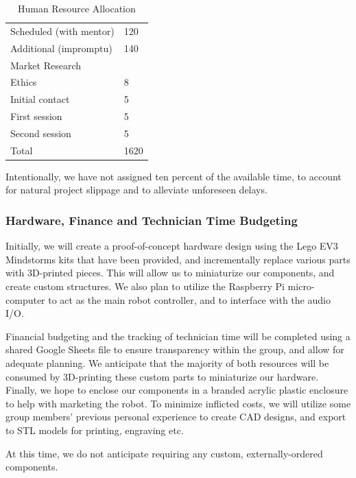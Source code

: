 \documentclass{article}
\begin{document}
\begin{table}[]
\begin{center}
\begin{small}
\begin{tabular}{|l|l|}
\quad Scheduled (with mentor)        & 120   \\
\quad Additional (impromptu)         & 140   \\ \hline
Market Research                &       \\
\quad Ethics                         & 8     \\
\quad Initial contact                & 5     \\
\quad First session                  & 5     \\
\quad Second session                 & 5     \\ \hline
Total                          & 1620  \\ \hline
\end{tabular}
\end{small}
\caption{Human Resource Allocation}
\label{table:hours}
\end{center}
\end{table}

Intentionally, we have not assigned ten percent of the available time, to account for natural project slippage and to alleviate unforeseen delays.

\subsubsection{Hardware, Finance and Technician Time Budgeting}

Initially, we will create a proof-of-concept hardware design using the Lego EV3 Mindstorms kits that have been provided, and incrementally replace various parts with 3D-printed pieces. This will allow us to miniaturize our components, and create custom structures. We also plan to utilize the Raspberry Pi micro-computer to act as the main robot controller, and to interface with the audio I/O.

Financial budgeting and the tracking of technician time will be completed using a shared Google Sheets file to ensure transparency within the group, and allow for adequate planning. We anticipate that the majority of both resources will be consumed by 3D-printing these custom parts to miniaturize our hardware. Finally, we hope to enclose our components in a branded acrylic plastic enclosure to help with marketing the robot. To minimize inflicted costs, we will utilize some group members' previous personal experience to create CAD designs, and export to STL models for printing, engraving etc.

At this time, we do not anticipate requiring any custom, externally-ordered components.
\end{document}

